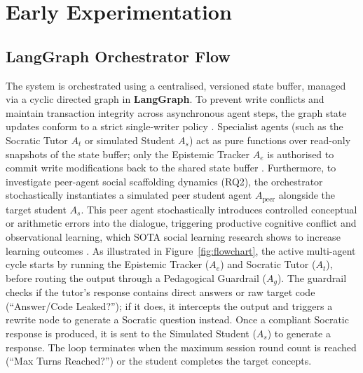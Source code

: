 \chapter{Early Experimentation}
\label{ch:tech}

\section{LangGraph Orchestrator Flow}
The system is orchestrated using a centralised, versioned state buffer, managed via a cyclic directed graph in \textbf{LangGraph}. To prevent write conflicts and maintain transaction integrity across asynchronous agent steps, the graph state updates conform to a strict single-writer policy \cite{intellicode2025}. Specialist agents (such as the Socratic Tutor $A_t$ or simulated Student $A_s$) act as pure functions over read-only snapshots of the state buffer; only the Epistemic Tracker $A_e$ is authorised to commit write modifications back to the shared state buffer \cite{elhaimeur2026itas}. Furthermore, to investigate peer-agent social scaffolding dynamics (RQ2), the orchestrator stochastically instantiates a simulated peer student agent $A_{\text{peer}}$ alongside the target student $A_s$. This peer agent stochastically introduces controlled conceptual or arithmetic errors into the dialogue, triggering productive cognitive conflict and observational learning, which SOTA social learning research shows to increase learning outcomes \cite{kumar2026beyond}. As illustrated in Figure~\ref{fig:flowchart}, the active multi-agent cycle starts by running the Epistemic Tracker ($A_e$) and Socratic Tutor ($A_t$), before routing the output through a Pedagogical Guardrail ($A_g$). The guardrail checks if the tutor's response contains direct answers or raw target code (``Answer/Code Leaked?''); if it does, it intercepts the output and triggers a rewrite node to generate a Socratic question instead. Once a compliant Socratic response is produced, it is sent to the Simulated Student ($A_s$) to generate a response. The loop terminates when the maximum session round count is reached (``Max Turns Reached?'') or the student completes the target concepts.


